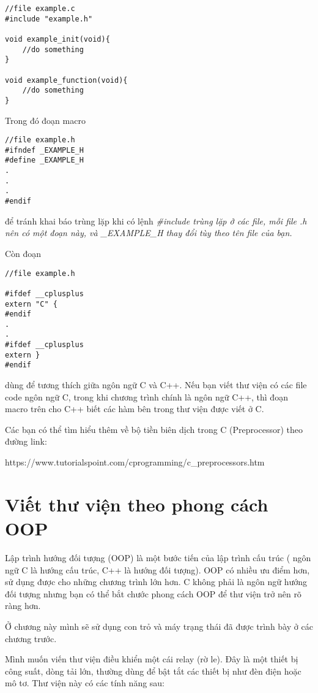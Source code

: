 \begin{lstlisting}
//file example.c
#include "example.h"

void example_init(void){
	//do something
}

void example_function(void){
	//do something
}

\end{lstlisting}


Trong đó đoạn macro
\begin{lstlisting}
//file example.h
#ifndef _EXAMPLE_H
#define _EXAMPLE_H
.
.
.
#endif
\end{lstlisting}

để tránh khai báo trùng lặp khi có lệnh \it{\#include} trùng lặp ở các file, mỗi file \textit{.h} nên có một đoạn này, và \it{\_EXAMPLE\_H} thay đổi tùy theo tên file của bạn.

Còn đoạn
\begin{lstlisting}
//file example.h

#ifdef __cplusplus
extern "C" {
#endif
.
.
#ifdef __cplusplus
extern }
#endif

\end{lstlisting}

dùng để tương thích giữa ngôn ngữ C và C++. Nếu bạn viết thư viện có các file code ngôn ngữ C, trong khi chương trình chính là ngôn ngữ C++, thì đoạn macro trên cho C++ biết các hàm bên trong thư viện được viết ở C.

Các bạn có thể tìm hiểu thêm về bộ tiền biên dịch trong C (Preprocessor) theo đường link: 

https://www.tutorialspoint.com/cprogramming/c\_preprocessors.htm

\section{Viết thư viện theo phong cách OOP}

Lập trình hướng đối tượng (OOP) là một bước tiến của lập trình cấu trúc ( ngôn ngữ C là hướng cấu trúc, C++ là hướng đối tượng). OOP có nhiều ưu điểm hơn, sử dụng được cho những chương trình lớn hơn. C không phải là ngôn ngữ hướng đối tượng nhưng bạn có thể bắt chước phong cách OOP để thư viện trở nên rõ ràng hơn.

Ở chương này mình sẽ sử dụng con trỏ và máy trạng thái đã được trình bày ở các chương trước.

Mình muốn viến thư viện điều khiển một cái relay (rờ le). Đây là một thiết bị công suất, dòng tải lớn, thường dùng để bật tắt các thiết bị như đèn điện hoặc mô tơ. Thư viện này có các tính năng sau:

